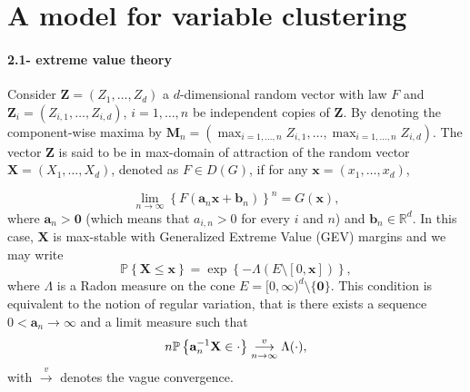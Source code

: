 \documentclass[11pt]{article}
\begin{document}
	\section{A model for variable clustering}
	\label{sec:variable_clust}
	
	\paragraph{2.1- extreme value theory} Consider $\textbf{Z}= (Z_1,\dots, Z_d)$ a $d$-dimensional random vector with law $F$ and $\textbf{Z}_{i} = (Z_{i,1},\dots, Z_{i,d})$, $i = 1,\dots,n$ be independent copies of $\textbf{Z}$. By denoting the component-wise maxima by $\textbf{M}_n = (\max_{i=1,\dots,n} Z_{i,1}, \dots, \max_{i=1,\dots,n} Z_{i,d})$. The vector $\textbf{Z}$ is said to be in max-domain of attraction of the random vector $\textbf{X} = (X_1, \dots, X_d)$, denoted as $F \in D(G)$, if for any $\textbf{x} = (x_1,\dots,x_d)$,
	
	\begin{equation}
		\label{eq:domain_attraction}
		\underset{n \rightarrow \infty}{\lim} \left\{ F(\textbf{a}_n \textbf{x} + \textbf{b}_n) \right\}^n = G(\textbf{x}),
	\end{equation}
	where $\textbf{a}_n > \textbf{0}$ (which means that $a_{i,n} > 0$ for every $i$ and $n$) and $\textbf{b}_n \in \mathbb{R}^d$. In this case, $\textbf{X}$ is max-stable with Generalized Extreme Value (GEV) margins and we may write
	\begin{equation*}
		\mathbb{P}\left\{ \textbf{X} \leq \textbf{x}\right\} = \exp \left\{ -\Lambda(E \setminus [0,\textbf{x}]) \right\},
	\end{equation*}
	where $\Lambda$ is a Radon measure on the cone $E = [0,\infty)^d \setminus \{\textbf{0}\}$. This condition is equivalent to the notion of regular variation, that is there exists a sequence $0 < \textbf{a}_n \rightarrow \infty$ and a limit measure such that
	\begin{equation*}
		n \mathbb{P}\left\{ \textbf{a}_n^{-1} \textbf{X} \in \cdot \right\} \overunderset{v}{n \rightarrow \infty}{\longrightarrow} \Lambda(\cdot),
	\end{equation*}
	with $\overset{v}{\rightarrow}$ denotes the vague convergence.
	
\end{document}
